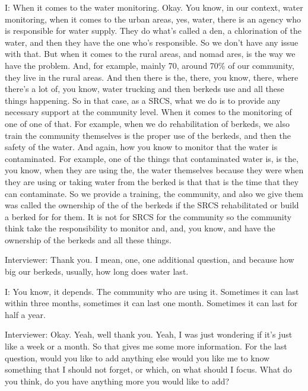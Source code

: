 I: When it comes to the water monitoring. Okay. You know, in our context, water monitoring, when it comes to the urban areas, yes, water, there is an agency who is responsible for water supply. They do what's called a den, a chlorination of the water, and then they have the one who's responsible. So we don't have any issue with that. But when it comes to the rural areas, and nomad ares, is the way we have the problem. And, for example, mainly 70, around 70\% of our community, they live in the rural areas. And then there is the, there, you know, there, where there's a lot of, you know, water trucking and then berkeds use and all these things happening. So in that case, as a SRCS, what we do is to provide any necessary support at the community level. When it comes to the monitoring of one of one of that. For example, when we do rehabilitation of berkeds, we also train the community themselves is the proper use of the berkeds, and then the safety of the water. And again, how you know to monitor that the water is contaminated. For example, one of the things that contaminated water is, is the, you know, when they are using the, the water themselves because they were when they are using or taking water from the berked is that that is the time that they can contaminate. So we provide a training, the community, and also we give them was called the ownership of the of the berkeds if the SRCS rehabilitated or build a berked for for them. It is not for SRCS for the community so the community think take the responsibility to monitor and, and, you know, and have the ownership of the berkeds and all these things.

Interviewer:   Thank you. I mean, one, one additional question, and because how big our berkeds, usually, how long does water last. 

I: You know, it depends. The community who are using it. Sometimes it can last within three months, sometimes it can last one month. Sometimes it can last for half a year. 

Interviewer:  Okay. Yeah, well thank you. Yeah, I was just wondering if it's just like a week or a month. So that gives me some more information. For the last question, would you like to add anything else would you like me to know something that I should not forget, or which, on what should I focus. What do you think, do you have anything more you would like to add?

